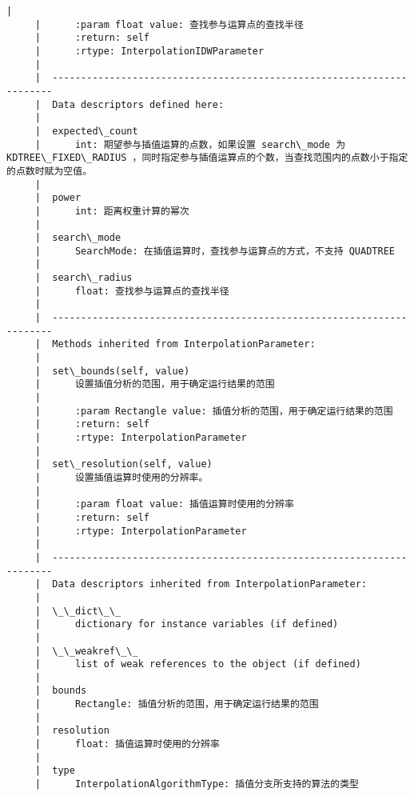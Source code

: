 \documentclass[11pt]{article}
\begin{document}
\begin{Verbatim}[commandchars=\\\{\}]
     |      
     |      :param float value: 查找参与运算点的查找半径
     |      :return: self
     |      :rtype: InterpolationIDWParameter
     |  
     |  ----------------------------------------------------------------------
     |  Data descriptors defined here:
     |  
     |  expected\_count
     |      int: 期望参与插值运算的点数，如果设置 search\_mode 为 KDTREE\_FIXED\_RADIUS ，同时指定参与插值运算点的个数，当查找范围内的点数小于指定的点数时赋为空值。
     |  
     |  power
     |      int: 距离权重计算的幂次
     |  
     |  search\_mode
     |      SearchMode: 在插值运算时，查找参与运算点的方式，不支持 QUADTREE
     |  
     |  search\_radius
     |      float: 查找参与运算点的查找半径
     |  
     |  ----------------------------------------------------------------------
     |  Methods inherited from InterpolationParameter:
     |  
     |  set\_bounds(self, value)
     |      设置插值分析的范围，用于确定运行结果的范围
     |      
     |      :param Rectangle value: 插值分析的范围，用于确定运行结果的范围
     |      :return: self
     |      :rtype: InterpolationParameter
     |  
     |  set\_resolution(self, value)
     |      设置插值运算时使用的分辨率。
     |      
     |      :param float value: 插值运算时使用的分辨率
     |      :return: self
     |      :rtype: InterpolationParameter
     |  
     |  ----------------------------------------------------------------------
     |  Data descriptors inherited from InterpolationParameter:
     |  
     |  \_\_dict\_\_
     |      dictionary for instance variables (if defined)
     |  
     |  \_\_weakref\_\_
     |      list of weak references to the object (if defined)
     |  
     |  bounds
     |      Rectangle: 插值分析的范围，用于确定运行结果的范围
     |  
     |  resolution
     |      float: 插值运算时使用的分辨率
     |  
     |  type
     |      InterpolationAlgorithmType: 插值分支所支持的算法的类型
    

\end{Verbatim}
\end{document}
